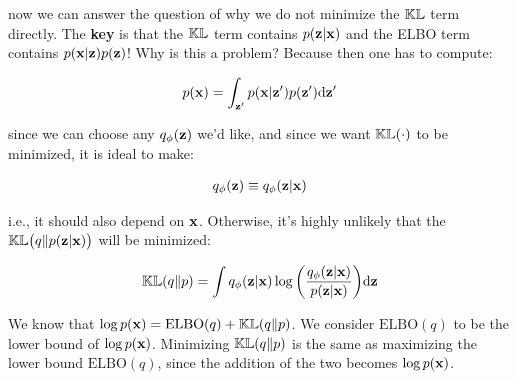 \documentclass{article}
\begin{document}
now we can answer the question of why we do not minimize the $\mathbb{KL}$ term directly. The {\bf key} is that the $\mathbb{KL}$ term contains $p({\mathbf z} | {\mathbf x})$ and the ELBO term contains $p({\mathbf x}|{\mathbf z}) p({\mathbf z})$! Why is this a problem? Because then one has to compute:


\begin{equation}\begin{split}
p({\mathbf x}) = \int_{{\mathbf z}'} p({\mathbf x} | {\mathbf z}') p({\mathbf z}') \text{d} {\mathbf z}'
\end{split}\end{equation}


%




since we can choose any $q_\phi({\mathbf z})$ we'd like, and since we want $\mathbb{KL}(\cdot)$ to be minimized, it is ideal to make:

\begin{equation}\begin{split}
q_\phi({\mathbf z}) \equiv q_\phi({\mathbf z}|{\mathbf x})
\end{split}\end{equation}

i.e., it should also depend on ${\mathbf x}$. Otherwise, it's highly unlikely that the $ \mathbb{KL} \big(q\|p({\mathbf z}|{\mathbf x}) \big) $ will be minimized:


\begin{equation}\begin{split}
 \mathbb{KL}(q\|p) = \int q_\phi({\mathbf z}|{\mathbf x}) \log{  \left(   \frac{q_\phi({\mathbf z}|{\mathbf x})}{p({\mathbf z}|{\mathbf x})}  \right)  } \text{d} {\mathbf z}
\end{split}\end{equation}

We know that $\log p({\mathbf x}) = \text{ELBO}(q) + \mathbb{KL}(q\|p) $. We consider $\text{ELBO}(q)$ to be the lower bound of $\log p({\mathbf x})$. Minimizing $\mathbb{KL} (q\| p)$ is the same as maximizing the lower bound $\text{ELBO}(q)$, since the addition of the two becomes $\log p({\mathbf x})$.
\newpage
\end{document}
